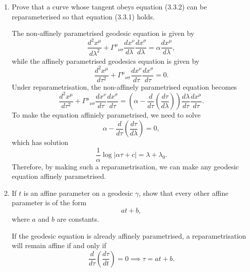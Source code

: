\begin{enumerate}[label=\alph*)]
    \item Prove that a curve whose tangent obeys equation (3.3.2) can be
    reparameterised so that equation (3.3.1) holds.
    \begin{solution}
        The non-affinely parametrised geodesic equation is given by
        \begin{equation}
            \frac{d^2x^\mu}{d\lambda^2} +\Gamma^\mu{}_{\nu\sigma}\frac{dx^\nu}{d\lambda}\frac{dx^\sigma}{d\lambda} = \alpha\frac{dx^\mu}{d\lambda},
        \end{equation}
        while the affinely parametrised geodesics equation is given by
        \begin{equation}
             \frac{d^2x^\mu}{d\tau^2} +\Gamma^\mu{}_{\nu\sigma}\frac{dx^\nu}{d\tau}\frac{dx^\sigma}{d\tau} =0.
        \end{equation}
        Under reparametrisation, the non-affinely parametrised equation becomes
        \begin{equation}
            \frac{d^2x^\mu}{d\tau^2} +\Gamma^\mu{}_{\nu\sigma}\frac{dx^\nu}{d\tau}\frac{dx^\sigma}{d\tau} = \left(\alpha - \frac{d}{d\tau}\left(\frac{d\tau}{d\lambda}\right)\right)\frac{d\lambda}{d\tau}\frac{dx^\mu}{d\tau}.
        \end{equation}
        To make the equation affiniely parametrised, we need to solve
        \begin{equation}
            \alpha - \frac{d}{d\tau}\left(\frac{d\tau}{d\lambda}\right) = 0,
        \end{equation}
        which has solution
        \begin{equation}
            \frac{1}{\alpha}\log|\alpha\tau +c| = \lambda + \lambda_0.
        \end{equation}
        Therefore, by making such a reparametrisation, we can make any geodesic equation affinely parametrised.
    \end{solution}

    \item If $t$ is an affine parameter on a geodesic $\gamma$, show that every
    other affine parameter is of the form
    \begin{equation}
        at+b,
    \end{equation}
    where $a$ and $b$ are constants.
    \begin{solution}
        If the geodesic equation is already affinely parametrised, a reparametrisation will remain affine if and only if
        \begin{equation}
            \frac{d}{d\tau}\left(\frac{d\tau}{dt}\right) =0 \implies \tau = at +b.
        \end{equation}
    \end{solution}
\end{enumerate}

